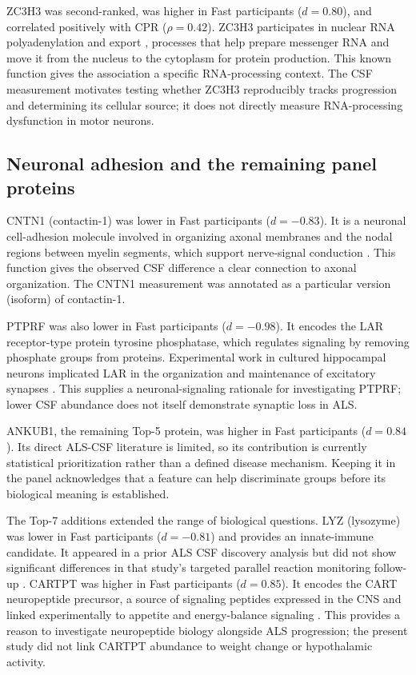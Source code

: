 \documentclass[11pt,letterpaper]{article}
\begin{document}
ZC3H3 was second-ranked, was higher in Fast participants ($d = 0.80$), and correlated positively with CPR ($\rho = 0.42$). ZC3H3 participates in nuclear RNA polyadenylation and export \citep{hurt2009}, processes that help prepare messenger RNA and move it from the nucleus to the cytoplasm for protein production. This known function gives the association a specific RNA-processing context. The CSF measurement motivates testing whether ZC3H3 reproducibly tracks progression and determining its cellular source; it does not directly measure RNA-processing dysfunction in motor neurons.

\subsection{Neuronal adhesion and the remaining panel proteins}

CNTN1 (contactin-1) was lower in Fast participants ($d = -0.83$). It is a neuronal cell-adhesion molecule involved in organizing axonal membranes and the nodal regions between myelin segments, which support nerve-signal conduction \citep{colakoglu2014}. This function gives the observed CSF difference a clear connection to axonal organization. The CNTN1 measurement was annotated as a particular version (isoform) of contactin-1.

PTPRF was also lower in Fast participants ($d = -0.98$). It encodes the LAR receptor-type protein tyrosine phosphatase, which regulates signaling by removing phosphate groups from proteins. Experimental work in cultured hippocampal neurons implicated LAR in the organization and maintenance of excitatory synapses \citep{dunah2005}. This supplies a neuronal-signaling rationale for investigating PTPRF; lower CSF abundance does not itself demonstrate synaptic loss in ALS.

ANKUB1, the remaining Top-5 protein, was higher in Fast participants ($d = 0.84$). Its direct ALS-CSF literature is limited, so its contribution is currently statistical prioritization rather than a defined disease mechanism. Keeping it in the panel acknowledges that a feature can help discriminate groups before its biological meaning is established.

The Top-7 additions extended the range of biological questions. LYZ (lysozyme) was lower in Fast participants ($d = -0.81$) and provides an innate-immune candidate. It appeared in a prior ALS CSF discovery analysis but did not show significant differences in that study's targeted parallel reaction monitoring follow-up \citep{oh2023}. CARTPT was higher in Fast participants ($d = 0.85$). It encodes the CART neuropeptide precursor, a source of signaling peptides expressed in the CNS and linked experimentally to appetite and energy-balance signaling \citep{kristensen1998}. This provides a reason to investigate neuropeptide biology alongside ALS progression; the present study did not link CARTPT abundance to weight change or hypothalamic activity.
\end{document}
